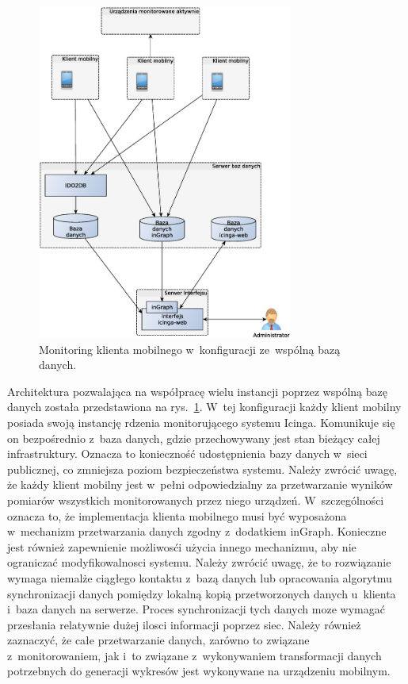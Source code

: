 \begin{figure}[ht]
  \centering
  \caption{Monitoring klienta mobilnego w~konfiguracji ze~wspólną bazą
    danych.}
  \label{fig:mobilnyWspBaza}
\includegraphics[width=0.75\textwidth]{img/mobilnyWspBaza}
\end{figure}

Architektura pozwalająca na współpracę wielu instancji poprzez wspólną
bazę danych została przedstawiona na
rys.~\ref{fig:mobilnyWspBaza}. W~tej konfiguracji każdy klient mobilny
posiada swoją instancję rdzenia monitorującego systemu
Icinga. Komunikuje się on bezpośrednio z~baza danych, gdzie
przechowywany jest stan bieżący całej infrastruktury. Oznacza to
konieczność udostępnienia bazy danych w~sieci publicznej, co zmniejsza
poziom bezpieczeństwa systemu. Należy zwrócić uwagę, że każdy klient
mobilny jest w~pełni odpowiedzialny za przetwarzanie wyników pomiarów
wszystkich monitorowanych przez niego urządzeń. W~szczególności
oznacza to, że implementacja klienta mobilnego musi być wyposażona
w~mechanizm przetwarzania danych zgodny z~dodatkiem inGraph. Konieczne
jest również zapewnienie możliwosći użycia innego mechanizmu, aby nie
ograniczać modyfikowalnosci systemu. Należy zwrócić uwagę, że to
rozwiązanie wymaga niemalże ciągłego kontaktu z~bazą danych lub
opracowania algorytmu synchronizacji danych pomiędzy lokalną kopią
przetworzonych danych u~klienta i~baza danych na serwerze. Proces
synchronizacji tych danych moze wymagać przesłania relatywnie dużej
ilosci informacji poprzez siec. Należy również zaznaczyć, że całe
przetwarzanie danych, zarówno to związane z~monitorowaniem, jak i~to
związane z~wykonywaniem transformacji danych potrzebnych do generacji
wykresów jest wykonywane na urządzeniu mobilnym.

